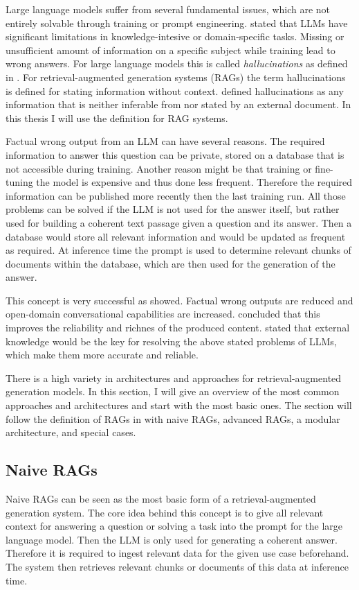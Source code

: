 Large language models suffer from several fundamental issues, which are not entirely solvable through training or prompt engineering. 
\citet{Gao.18.12.2023} stated that LLMs have significant limitations in knowledge-intesive or domain-specific tasks. Missing or unsufficient amount of information on a specific subject while training lead to wrong answers. For large language models this is called \textit{hallucinations} as defined in \citet{Huang.2023}. For retrieval-augmented generation systems (RAGs) the term hallucinations is defined for stating information without context. \citet{Rashkin.} defined hallucinations as any information that is neither inferable from nor stated by an external document. In this thesis I will use the definition for RAG systems. 

Factual wrong output from an LLM can have several reasons. The required information to answer this question can be private, stored on a database that is not accessible during training. Another reason might be that training or fine-tuning the model is expensive and thus done less frequent. Therefore the required information can be published more recently then the last training run. All those problems can be solved if the LLM is not used for the answer itself, but rather used for building a coherent text passage given a question and its answer. Then a database would store all relevant information and would be updated as frequent as required. At inference time the prompt is used to determine relevant chunks of documents within the database, which are then used for the generation of the answer.

This concept is very successful as \citet{Shuster.} showed. Factual wrong outputs are reduced and open-domain conversational capabilities are increased. \citet{Yu.2024} concluded that this improves the reliability and richnes of the produced content. \citet{Chen.2024} stated that external knowledge would be the key for resolving the above stated problems of LLMs, which make them more accurate and reliable.

There is a high variety in architectures and approaches for retrieval-augmented generation models. In this section, I will give an overview of the most common approaches and architectures and start with the most basic ones. The section will follow the definition of RAGs in \citet{Gao.18.12.2023} with naive RAGs, advanced RAGs, a modular architecture, and special cases. 

\subsection{Naive RAGs}
\label{sec:naive_rags}
Naive RAGs can be seen as the most basic form of a retrieval-augmented generation system. The core idea behind this concept is to give all relevant context for answering a question or solving a task into the prompt for the large language model. Then the LLM is only used for generating a coherent answer. Therefore it is required to ingest relevant data for the given use case beforehand. The system then retrieves relevant chunks or documents of this data at inference time. 


